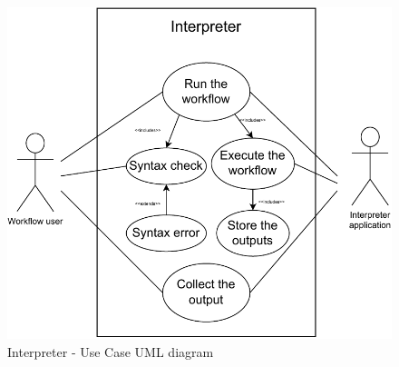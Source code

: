 \begin{figure}[h!]
    \includegraphics{./img/interpreterUC.pdf}
    \caption{Interpreter - Use Case UML diagram}
\end{figure}
